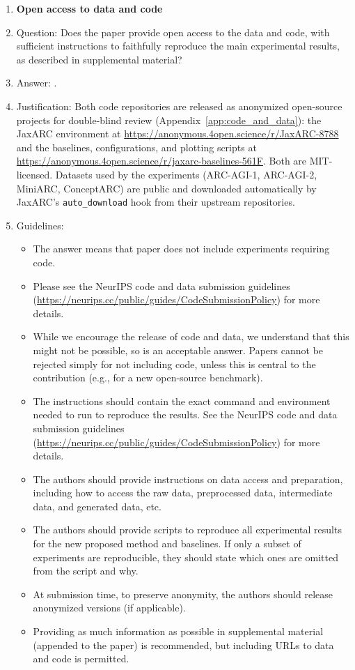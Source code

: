 \begin{enumerate}
\item {\bf Open access to data and code}
    \item[] Question: Does the paper provide open access to the data and code, with sufficient instructions to faithfully reproduce the main experimental results, as described in supplemental material?
    \item[] Answer: \answerYes{}.
    \item[] Justification: Both code repositories are released as anonymized open-source projects for double-blind review (Appendix~\ref{app:code_and_data}): the JaxARC environment at \url{https://anonymous.4open.science/r/JaxARC-8788} and the baselines, configurations, and plotting scripts at \url{https://anonymous.4open.science/r/jaxarc-baselines-561F}. Both are MIT-licensed. Datasets used by the experiments (ARC-AGI-1, ARC-AGI-2, MiniARC, ConceptARC) are public and downloaded automatically by JaxARC's \texttt{auto\_download} hook from their upstream repositories.
    \item[] Guidelines:
    \begin{itemize}
        \item The answer \answerNA{} means that paper does not include experiments requiring code.
        \item Please see the NeurIPS code and data submission guidelines (\url{https://neurips.cc/public/guides/CodeSubmissionPolicy}) for more details.
        \item While we encourage the release of code and data, we understand that this might not be possible, so \answerNo{} is an acceptable answer. Papers cannot be rejected simply for not including code, unless this is central to the contribution (e.g., for a new open-source benchmark).
        \item The instructions should contain the exact command and environment needed to run to reproduce the results. See the NeurIPS code and data submission guidelines (\url{https://neurips.cc/public/guides/CodeSubmissionPolicy}) for more details.
        \item The authors should provide instructions on data access and preparation, including how to access the raw data, preprocessed data, intermediate data, and generated data, etc.
        \item The authors should provide scripts to reproduce all experimental results for the new proposed method and baselines. If only a subset of experiments are reproducible, they should state which ones are omitted from the script and why.
        \item At submission time, to preserve anonymity, the authors should release anonymized versions (if applicable).
        \item Providing as much information as possible in supplemental material (appended to the paper) is recommended, but including URLs to data and code is permitted.
    \end{itemize}



\end{enumerate}
